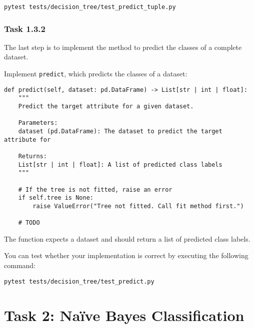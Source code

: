 \documentclass[
english,
smallborders
]{i6prcsht}
\begin{document}
\vspace*{0.3cm}

\begin{lstlisting}
pytest tests/decision_tree/test_predict_tuple.py
\end{lstlisting}

\vspace*{0.1cm}

\subsubsection*{Task 1.3.2}

The last step is to implement the method to predict the classes of a complete dataset.

Implement \texttt{predict}, which predicts the classes of a dataset:

\vspace*{0.3cm}

\begin{lstlisting}
def predict(self, dataset: pd.DataFrame) -> List[str | int | float]:
	"""
	Predict the target attribute for a given dataset.

	Parameters:
	dataset (pd.DataFrame): The dataset to predict the target attribute for

	Returns:
	List[str | int | float]: A list of predicted class labels
	"""

	# If the tree is not fitted, raise an error
	if self.tree is None:
		raise ValueError("Tree not fitted. Call fit method first.")

	# TODO
\end{lstlisting}

\vspace*{0.1cm}

The function expects a dataset and should return a list of predicted class labels.

You can test whether your implementation is correct by executing the following command:

\vspace*{0.3cm}

\begin{lstlisting}
pytest tests/decision_tree/test_predict.py
\end{lstlisting}

\vspace*{0.1cm}


\newpage

\section*{Task 2: Naïve Bayes Classification}
\label{sec:task-two}
\end{document}
